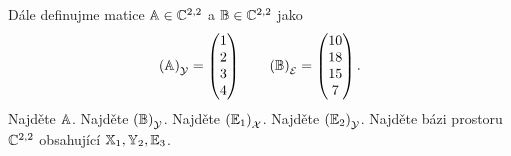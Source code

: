 \documentclass{article}
\newcommand{\mathbasis}{\ensuremath{\mathcal}}
\newcommand{\mathfield}{\ensuremath{\mathbb}}
\newcommand{\mathmat}{\ensuremath{\mathbb}}
\begin{document}
\begin{Exercise}[name=Úkol, label=bases]
\[	\]
	Dále definujme matice \( \mathmat{A} \in \mathfield{C}^{2, 2} \) a \( \mathmat{B} \in \mathfield{C}^{2, 2} \) jako
	\[
		\left( \mathmat{A} \right)_\mathbasis{Y} = \begin{pmatrix} 1 \\ 2 \\ 3 \\ 4 \end{pmatrix} \qquad
		\left( \mathmat{B} \right)_\mathbasis{E} = \begin{pmatrix} 10 \\ 18 \\ 15 \\ 7 \end{pmatrix}\text{.}
	\]
	\Question Najděte \( \mathmat{A} \).
	\Question Najděte \( \left( \mathmat{B} \right)_\mathbasis{Y} \).
	\Question Najděte \( \left( \mathmat{E}_1 \right)_\mathbasis{X} \).
	\Question Najděte \( \left( \mathmat{E}_2 \right)_\mathbasis{Y} \).
	\Question Najděte bázi prostoru \( \mathfield{C}^{2, 2} \) obsahující \( \mathmat{X}_1, \mathmat{Y}_2, \mathmat{E}_3 \).
\end{Exercise}
\end{document}
